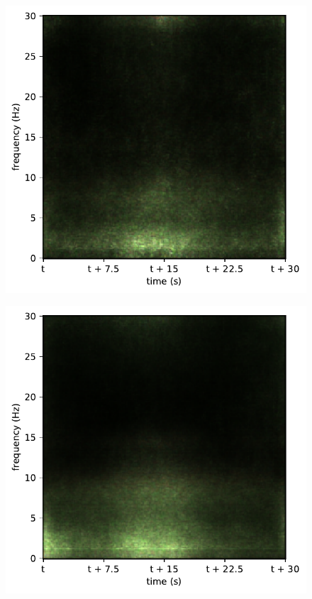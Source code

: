 \begin{subfigure}{.16\textwidth}
  \centering
  \includegraphics[width=1\linewidth]{./../Article/pics/class_master_0}
  \caption{}
  \label{fig_1_21}
\end{subfigure}%
\begin{subfigure}{.16\textwidth}
  \centering
  \includegraphics[width=1\linewidth]{./../Article/pics/class_master_1}
  \caption{}
  \label{fig_1_22}
\end{subfigure}%
